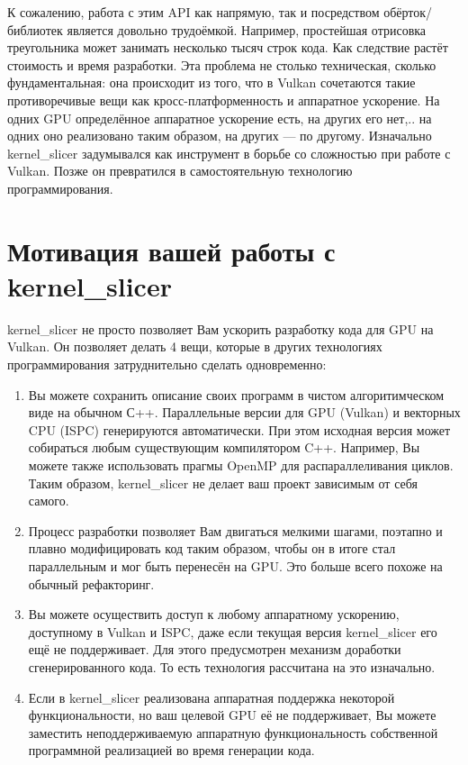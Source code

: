 \documentclass[11pt,fleqn,english,russian]{report} %
\begin{document}
К сожалению, работа с этим API как напрямую, так и посредством обёрток/библиотек является довольно трудоёмкой. Например, простейшая отрисовка треугольника может занимать несколько тысяч строк кода. Как следствие растёт стоимость и время разработки. Эта проблема не столько техническая, сколько фундаментальная: она происходит из того, что в Vulkan сочетаются такие противоречивые вещи как кросс-платформенность и аппаратное ускорение. На одних GPU определённое аппаратное ускорение есть, на других его нет,.. на одних оно реализовано таким образом, на других --- по другому. Изначально kernel\_slicer задумывался как инструмент в борьбе со сложностью при работе с Vulkan. Позже он превратился в самостоятельную технологию программирования.

\section{Мотивация вашей работы с kernel\_slicer }

kernel\_slicer не просто позволяет Вам ускорить разработку кода для GPU на Vulkan. Он позволяет делать 4 вещи, которые в других технологиях программирования затруднительно сделать одновременно:

\begin{enumerate}

\item Вы можете сохранить описание своих программ в чистом алгоритимческом виде на обычном С++. Параллельные версии для GPU (Vulkan) и векторных CPU (ISPC) генерируются автоматически. При этом исходная версия может собираться любым существующим компилятором C++. Например, Вы можете также использовать прагмы OpenMP для распараллеливания циклов. Таким образом, kernel\_slicer не делает ваш проект зависимым от себя самого.

\item Процесс разработки позволяет Вам двигаться мелкими шагами, поэтапно и плавно модифицировать код таким образом, чтобы он в итоге стал параллельным и мог быть перенесён на GPU. Это больше всего похоже на обычный рефакторинг.

\item Вы можете осуществить доступ к любому аппаратному ускорению, доступному в Vulkan и ISPC, даже если текущая версия kernel\_slicer его ещё не поддерживает. Для этого предусмотрен механизм доработки сгенерированного кода. То есть технология рассчитана на это изначально.

\item Если в kernel\_slicer реализована аппаратная поддержка некоторой функциональности, но ваш целевой GPU её не поддерживает, Вы можете заместить неподдерживаемую аппаратную функциональность собственной программной реализацией во время генерации кода.
\end{enumerate}
\end{document}
